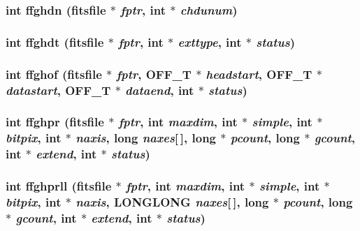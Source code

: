 \subsubsection{\setlength{\rightskip}{0pt plus 5cm}int ffghdn (\bf{fitsfile} $\ast$ {\em fptr}, int $\ast$ {\em chdunum})}\label{fitsio__64_8h_b931369499769d33e907da0a87a5f4b6}


\subsubsection{\setlength{\rightskip}{0pt plus 5cm}int ffghdt (\bf{fitsfile} $\ast$ {\em fptr}, int $\ast$ {\em exttype}, int $\ast$ {\em status})}\label{fitsio__64_8h_b6397953ca4869d2d95466d0b69fab90}


\subsubsection{\setlength{\rightskip}{0pt plus 5cm}int ffghof (\bf{fitsfile} $\ast$ {\em fptr}, OFF\_\-T $\ast$ {\em headstart}, OFF\_\-T $\ast$ {\em datastart}, OFF\_\-T $\ast$ {\em dataend}, int $\ast$ {\em status})}\label{fitsio__64_8h_ce0a6f7eeaab4cc5b53d42a9bcab393b}


\subsubsection{\setlength{\rightskip}{0pt plus 5cm}int ffghpr (\bf{fitsfile} $\ast$ {\em fptr}, int {\em maxdim}, int $\ast$ {\em simple}, int $\ast$ {\em bitpix}, int $\ast$ {\em naxis}, long {\em naxes}[$\,$], long $\ast$ {\em pcount}, long $\ast$ {\em gcount}, int $\ast$ {\em extend}, int $\ast$ {\em status})}\label{fitsio__64_8h_5eb7c7db8772313ff2612637ef1a1bf3}


\subsubsection{\setlength{\rightskip}{0pt plus 5cm}int ffghprll (\bf{fitsfile} $\ast$ {\em fptr}, int {\em maxdim}, int $\ast$ {\em simple}, int $\ast$ {\em bitpix}, int $\ast$ {\em naxis}, \bf{LONGLONG} {\em naxes}[$\,$], long $\ast$ {\em pcount}, long $\ast$ {\em gcount}, int $\ast$ {\em extend}, int $\ast$ {\em status})}\label{fitsio__64_8h_0d54065b1609c1b7edcbe08454996773}


